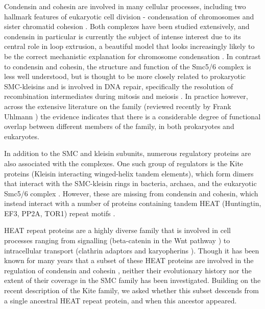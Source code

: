 \documentclass[a4paper,11pt,twoside,openright]{scrbook}
\begin{document}
Condensin and cohesin are involved in many cellular processes, including two hallmark features of eukaryotic cell division - condensation of chromosomes and sister chromatid cohesion \cite{Wood2010}. Both complexes have been studied extensively, and condensin in particular is currently the subject of intense interest due to its central role in loop extrusion, a beautiful model that looks increasingly likely to be the correct mechanistic explanation for chromosome condensation \cite{Nasmyth2001a,Alipour2012,Goloborodko2016,Wang2017}. In contrast to condensin and cohesin, the structure and function of the Smc5/6 complex is less well understood, but is thought to be more closely related to prokaryotic SMC-kleisins \cite{Palecek2015} and is involved in DNA repair, specifically the resolution of recombination intermediates during mitosis and meiosis \cite{Ampatzidou2006,Farmer2011}. In practice however, across the extensive literature on the family (reviewed recently by Frank Uhlmann \cite{Uhlmann2016}) the evidence indicates that there is a considerable degree of functional overlap between different members of the family, in both prokaryotes and eukaryotes.

In addition to the SMC and kleisin subunits, numerous regulatory proteins are also associated with the complexes. One such group of regulators is the Kite proteins (Kleisin interacting winged-helix tandem elements), which form dimers that interact with the SMC-kleisin rings in bacteria, archaea, and the eukaryotic Smc5/6 complex \cite{Palecek2015}. However, these are missing from condensin and cohesin, which instead interact with a number of proteins containing tandem HEAT (Huntingtin, EF3, PP2A, TOR1) repeat motifs \cite{Andrade1995}.

HEAT repeat proteins are a highly diverse family that is involved in cell processes ranging from signalling (beta-catenin in the Wnt pathway \cite{Morin1999}) to intracellular transport (clathrin adaptors \cite{McMahon2004} and karyopherins \cite{Chook2011}). Though it has been known for many years that a subset of these HEAT proteins are involved in the regulation of condensin and cohesin \cite{Neuwald2000}, neither their evolutionary history nor the extent of their coverage in the SMC family has been investigated. Building on the recent description of the Kite family, we asked whether this subset descends from a single ancestral HEAT repeat protein, and when this ancestor appeared.
\end{document}
